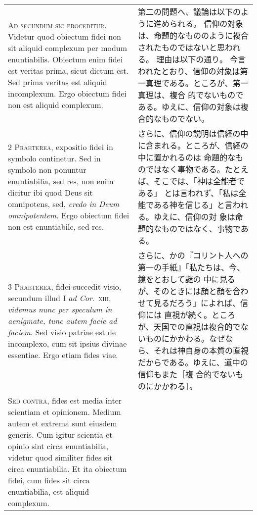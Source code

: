 \documentclass[10pt]{jsarticle} %
\begin{document}
\begin{longtable}{p{21em}p{21em}}
{\huge A}{\scshape d secundum sic proceditur}. Videtur
quod obiectum fidei non sit aliquid complexum per modum
enuntiabilis. Obiectum enim fidei est veritas prima, sicut dictum
est. Sed prima veritas est aliquid incomplexum. Ergo obiectum fidei non
est aliquid complexum.

&

第二の問題へ、議論は以下のように進められる。
信仰の対象は、命題的なもののように複合されたものではないと思われる。
理由は以下の通り。
今言われたとおり、信仰の対象は第一真理である。ところが、第一真理は、複合
 的でないものである。ゆえに、信仰の対象は複合的なものでない。


\\


{\scshape 2 Praeterea}, expositio fidei in symbolo
continetur. Sed in symbolo non ponuntur enuntiabilia, sed res, non enim
dicitur ibi quod Deus sit omnipotens, sed, {\itshape credo in Deum
omnipotentem}. Ergo obiectum fidei non est enuntiabile, sed res.

&

さらに、信仰の説明は信経の中に含まれる。ところが、信経の中に置かれるのは
 命題的なものではなく事物である。たとえば、そこでは、「神は全能者である」
 とは言われず、「私は全能である神を信じる」と言われる。ゆえに、信仰の対
 象は命題的なものではなく、事物である。


\\


{\scshape 3 Praeterea}, fidei succedit visio, secundum illud I {\itshape
ad Cor}.~{\scshape xiii}, {\itshape videmus nunc per speculum in
aenigmate, tunc autem facie ad faciem}. Sed visio patriae est de
incomplexo, cum sit ipsius divinae essentiae. Ergo etiam fides viae.

&

さらに、かの『コリント人への第一の手紙』「私たちは、今、鏡をとおして謎の
 中に見るが、そのときには顔と顔を合わせて見るだろう」によれば、信仰には
 直視が続く。ところが、天国での直視は複合的でないものにかかわる。なぜな
 ら、それは神自身の本質の直視だからである。ゆえに、道中の信仰もまた［複
 合的でないものにかかわる］。

\\


{\scshape Sed contra}, fides est media inter
scientiam et opinionem. Medium autem et extrema sunt eiusdem
generis. Cum igitur scientia et opinio sint circa enuntiabilia, videtur
quod similiter fides sit circa enuntiabilia. Et ita obiectum fidei, cum
fides sit circa enuntiabilia, est aliquid complexum.


\end{longtable}
\end{document}
